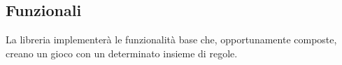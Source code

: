 
\subsection{Funzionali}

La libreria implementerà le funzionalità base che, opportunamente composte, creano un gioco con un determinato insieme di regole.


